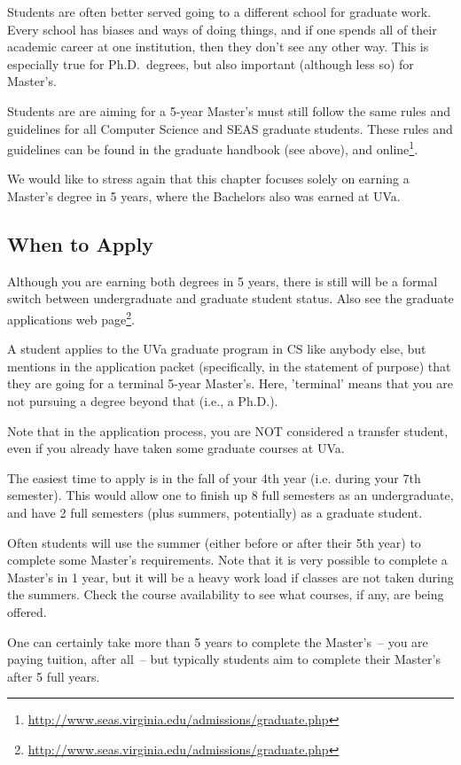 \documentclass[10pt,letter]{book}
\newcommand{\myurl}[1]{\footnote{\scriptsize\url{#1}}}
\begin{document}
Students are often better served going to a different school for
graduate work.  Every school has biases and ways of doing things, and
if one spends all of their academic career at one institution, then
they don't see any other way.  This is especially true for
Ph.D.\ degrees, but also important (although less so) for Master's.

Students are are aiming for a 5-year Master's must still follow the
same rules and guidelines for all Computer Science and SEAS graduate
students.  These rules and guidelines can be found in the graduate
handbook (see above), and
online\myurl{http://www.seas.virginia.edu/admissions/graduate.php}.

We would like to stress again that this chapter focuses solely on
earning a Master's degree in 5 years, where the Bachelors also was
earned at UVa.


\subsection{When to Apply}

Although you are earning both degrees in 5 years, there is still will
be a formal switch between undergraduate and graduate student status.
Also see the graduate applications web
page\myurl{http://www.seas.virginia.edu/admissions/graduate.php}.

A student applies to the UVa graduate program in CS like anybody else,
but mentions in the application packet (specifically, in the statement
of purpose) that they are going for a terminal 5-year Master's.  Here,
'terminal' means that you are not pursuing a degree beyond that (i.e.,
a Ph.D.).

Note that in the application process, you are NOT considered a
transfer student, even if you already have taken some graduate courses
at UVa.

The easiest time to apply is in the fall of your 4th year (i.e. during
your 7th semester).  This would allow one to finish up 8 full
semesters as an undergraduate, and have 2 full semesters (plus
summers, potentially) as a graduate student.

Often students will use the summer (either before or after their 5th
year) to complete some Master's requirements.  Note that it is very
possible to complete a Master's in 1 year, but it will be a heavy work
load if classes are not taken during the summers.  Check the course
availability to see what courses, if any, are being offered.

One can certainly take more than 5 years to complete the Master's~--
you are paying tuition, after all~-- but typically students aim to
complete their Master's after 5 full years.
\end{document}
